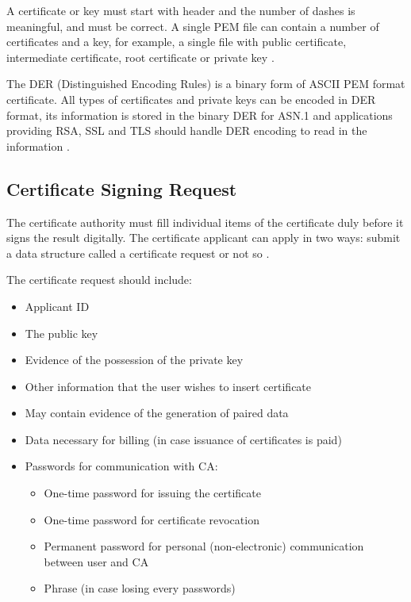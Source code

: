 \documentclass[
  digital, %
  notable,   %
  lof,     %
  lot,     %
]{fithesis3}
\begin{document}
A certificate or key must start with header and the number of dashes is meaningful, and must 
be correct. A single PEM file can contain a number of certificates and a key, for example, a 
single file with public certificate, intermediate certificate, root certificate or private key 
\cite{howToSsl}.

The DER (Distinguished Encoding Rules) is a binary form of ASCII PEM format 
certificate. All types of certificates and private keys can be encoded in DER format, its 
information is stored in the binary DER for ASN.1 and applications providing RSA, SSL and TLS 
should handle DER encoding to read in the information \cite{bakker_2014}.

\subsection{Certificate Signing Request}
The certificate authority must fill individual items of the certificate duly before it signs 
the result digitally. The certificate applicant can apply in two ways: submit a data 
structure called a certificate request or not so \cite{dostalek2016velky}.

The certificate request should include:
\begin{itemize}[leftmargin=2em,rightmargin=1em,itemsep=0.75\parskip,parsep=0em,topsep=0em,partopsep=0em]
\item Applicant ID
\item The public key
\item Evidence of the possession of the private key
\item Other information that the user wishes to insert certificate
\item May contain evidence of the generation of paired data
\item Data necessary for billing (in case issuance of certificates is paid)
\item Passwords for communication with CA:
  \begin{itemize}[leftmargin=2em,rightmargin=1em,itemsep=0.75\parskip,parsep=0em,topsep=0em,partopsep=0em]
  \item One-time password for issuing the certificate
  \item One-time password for certificate revocation
  \item Permanent password for personal (non-electronic) communication between user and CA
  \item Phrase (in case losing every passwords) 
  \end{itemize}
\end{itemize} 
\end{document}
